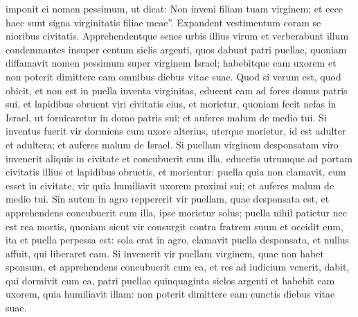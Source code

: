 \begin{biblechapter}
\begin{biblechapter}
\begin{biblechapter}
\begin{biblechapter}
\begin{biblechapter}
\begin{biblechapter}
\begin{biblechapter}
\begin{biblechapter}
\begin{biblechapter}
\begin{biblechapter}
\begin{biblechapter}
\begin{biblechapter}
\begin{biblechapter}
\begin{biblechapter}
\begin{biblechapter}
\begin{biblechapter}
\begin{biblechapter}
\begin{biblechapter}
\begin{biblechapter}
\begin{biblechapter}
\begin{biblechapter}
\begin{biblechapter}
\verse imponit ei nomen pessimum, ut dicat: Non inveni filiam tuam virginem; et ecce haec sunt signa virginitatis filiae meae”. Expandent vestimentum coram se nioribus civitatis. 
\verse Apprehendentque senes urbis illius virum et verberabunt illum 
\verse condemnantes insuper centum siclis argenti, quos dabunt patri puellae, quoniam diffamavit nomen pessimum super virginem Israel; habebitque eam uxorem et non poterit dimittere eam omnibus diebus vitae suae.
 \verse Quod si verum est, quod obicit, et non est in puella inventa virginitas, 
 \verse educent eam ad fores domus patris sui, et lapidibus obruent viri civitatis eius, et morietur, quoniam fecit nefas in Israel, ut fornicaretur in domo patris sui; et auferes malum de medio tui.
 \verse Si inventus fuerit vir dormiens cum uxore alterius, uterque morietur, id est adulter et adultera; et auferes malum de Israel.
 \verse Si puellam virginem desponsatam viro invenerit aliquis in civitate et concubuerit cum illa, 
\verse educetis utrumque ad portam civitatis illius et lapidibus obruetis, et morientur: puella quia non clamavit, cum esset in civitate, vir quia humiliavit uxorem proximi sui; et auferes malum de medio tui. 
\verse Sin autem in agro reppererit vir puellam, quae desponsata est, et apprehendens concubuerit cum illa, ipse morietur solus; 
\verse puella nihil patietur nec est rea mortis, quoniam sicut vir consurgit contra fratrem suum et occidit eum, ita et puella perpessa est: 
\verse sola erat in agro, clamavit puella desponsata, et nullus affuit, qui liberaret eam.
 \verse Si invenerit vir puellam virginem, quae non habet sponsum, et apprehendens concubuerit cum ea, et res ad iudicium venerit, 
\verse dabit, qui dormivit cum ea, patri puellae quinquaginta siclos argenti et habebit eam uxorem, quia humiliavit illam: non poterit dimittere eam cunctis diebus vitae suae.
 

\end{biblechapter}
\end{biblechapter}
\end{biblechapter}
\end{biblechapter}
\end{biblechapter}
\end{biblechapter}
\end{biblechapter}
\end{biblechapter}
\end{biblechapter}
\end{biblechapter}
\end{biblechapter}
\end{biblechapter}
\end{biblechapter}
\end{biblechapter}
\end{biblechapter}
\end{biblechapter}
\end{biblechapter}
\end{biblechapter}
\end{biblechapter}
\end{biblechapter}
\end{biblechapter}
\end{biblechapter}
